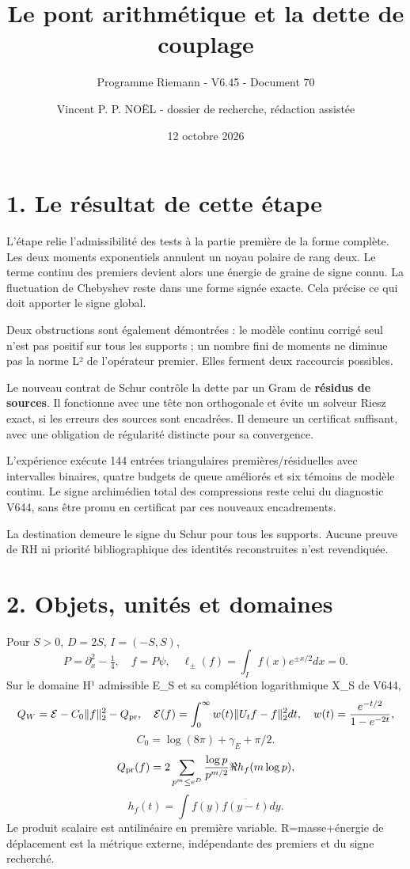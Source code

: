 \documentclass[
  10pt,
  a4paper,
]{article}
\title{Le pont arithmétique et la dette de couplage}
\subtitle{Programme Riemann - V6.45 - Document 70}
\author{Vincent P. P. NOËL - dossier de recherche, rédaction assistée}
\date{12 octobre 2026}
\begin{document}
\maketitle

{
\setcounter{tocdepth}{2}
\tableofcontents
}
\hypertarget{le-ruxe9sultat-de-cette-uxe9tape}{%
\section{1. Le résultat de cette
étape}\label{le-ruxe9sultat-de-cette-uxe9tape}}

L'étape relie l'admissibilité des tests à la partie première de la forme
complète. Les deux moments exponentiels annulent un noyau polaire de
rang deux. Le terme continu des premiers devient alors une énergie de
graine de signe connu. La fluctuation de Chebyshev reste dans une forme
signée exacte. Cela précise ce qui doit apporter le signe global.

Deux obstructions sont également démontrées : le modèle continu corrigé
seul n'est pas positif sur tous les supports ; un nombre fini de moments
ne diminue pas la norme L² de l'opérateur premier. Elles ferment deux
raccourcis possibles.

Le nouveau contrat de Schur contrôle la dette par un Gram de
\textbf{résidus de sources}. Il fonctionne avec une tête non orthogonale
et évite un solveur Riesz exact, si les erreurs des sources sont
encadrées. Il demeure un certificat suffisant, avec une obligation de
régularité distincte pour sa convergence.

L'expérience exécute 144 entrées triangulaires premières/résiduelles
avec intervalles binaires, quatre budgets de queue améliorés et six
témoins de modèle continu. Le signe archimédien total des compressions
reste celui du diagnostic V644, sans être promu en certificat par ces
nouveaux encadrements.

La destination demeure le signe du Schur pour tous les supports. Aucune
preuve de RH ni priorité bibliographique des identités reconstruites
n'est revendiquée.

\hypertarget{objets-unituxe9s-et-domaines}{%
\section{2. Objets, unités et
domaines}\label{objets-unituxe9s-et-domaines}}

Pour \(S>0\), \(D=2S\), \(I=(-S,S)\), \[
P=\partial_x^2-\tfrac14,\quad f=P\psi,\quad
\ell_\pm(f)=\int_I f(x)e^{\pm x/2}dx=0.
\] Sur le domaine H¹ admissible E\_S et sa complétion logarithmique X\_S
de V644, \[
Q_W=\mathcal E-C_0\|f\|_2^2-Q_{\rm pr},\quad
\mathcal E(f)=\int_0^\infty w(t)\|U_tf-f\|_2^2dt,
\quad w(t)=\frac{e^{-t/2}}{1-e^{-2t}},
\] \[
C_0=\log(8\pi)+\gamma_E+\pi/2.
\] \[
Q_{\rm pr}(f)=2\sum_{p^m\le e^D}\frac{\log p}{p^{m/2}}\Re h_f(m\log p),
\] \[
h_f(t)=\int f(y)\overline{f(y-t)}dy.
\] Le produit scalaire est antilinéaire en première variable.
R=masse+énergie de déplacement est la métrique externe, indépendante des
premiers et du signe recherché.
\end{document}
